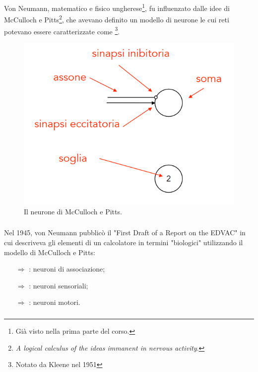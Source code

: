 Von Neumann, matematico e fisico ungherese\footnote{Già visto
nella prima parte del corso.}, fu influenzato dalle idee di
McCulloch e Pitts\footnote{
    \textit{A logical calculus of the ideas immanent in nervous activity}.
}, che avevano definito un modello di neurone
le cui reti potevano essere caratterizzate come \footnote{Notato da Kleene nel 1951}.

\begin{figure}[h]
    \centering
    \includegraphics[scale = 0.5]{images/McCulloch-Pitts.png}
    \caption{Il neurone di McCulloch e Pitts.}
\end{figure}

\subsubsection{}

Nel 1945, von Neumann pubblicò il "First Draft of a Report on the EDVAC" in cui
descriveva gli elementi di un calcolatore in termini "biologici" utilizzando
il modello di McCulloch e Pitts:

\begin{itemize}
    \item [$\Rightarrow$] : neuroni di associazione;
    \item [$\Rightarrow$] : neuroni sensoriali;
    \item [$\Rightarrow$] : neuroni motori.
\end{itemize}

\subsubsection{}

